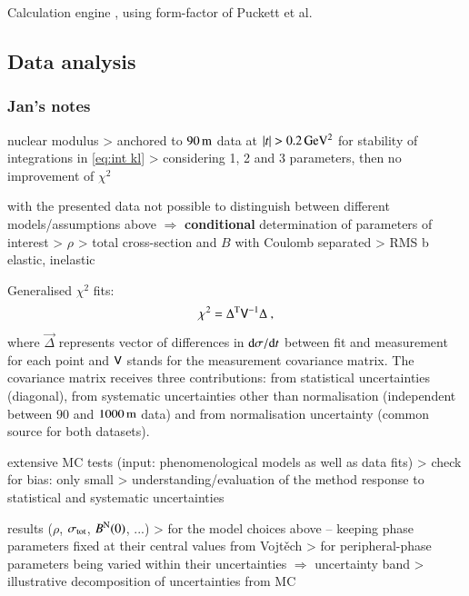 Calculation engine \cite{elegent}, using form-factor of Puckett et al.~\cite{puckett10}

\subsection{Data analysis}
\label{sec:cni_anal}

\subsubsection{Jan's notes}

\> nuclear modulus
\>> anchored to $90\,{\rm m}$ data at $|t| > 0.2\,{\rm GeV^2}$ for stability of integrations in \ref{eq:int kl}
\>> considering 1, 2 and 3 parameters, then no improvement of $\chi^2$

\> with the presented data not possible to distinguish between different models/assumptions above $\Rightarrow$ {\bf conditional} determination of parameters of interest
\>> $\rho$
\>> total cross-section and $B$ with Coulomb separated
\>> RMS b elastic, inelastic


Generalised $\chi^2$ fits:
\begin{equation}
\label{eq:chi sq}
	\chi^2 = \Delta^{\rm T} \mathsf{V}^{-1} \Delta\ ,
\end{equation}
where $\vec\Delta$ represents vector of differences in ${\rm d}\sigma/{\rm d} t$ between fit and measurement for each point and $\mathsf{V}$ stands for the measurement covariance matrix. The covariance matrix receives three contributions: from statistical uncertainties (diagonal), from systematic uncertainties other than normalisation (independent between $90$ and $1000\,{\rm m}$ data) and from normalisation uncertainty (common source for both datasets).

\> extensive MC tests (input: phenomenological models as well as data fits)
\>> check for bias: only small
\>> understanding/evaluation of the method response to statistical and systematic uncertainties

\> results ($\rho$, $\sigma_{\rm tot}$, $B^{\rm N}(0)$, ...)
\>> for the model choices above -- keeping phase parameters fixed at their central values from Vojt\v ech
\>> for peripheral-phase parameters being varied within their uncertainties $\Rightarrow$ uncertainty band
\>> illustrative decomposition of uncertainties from MC

